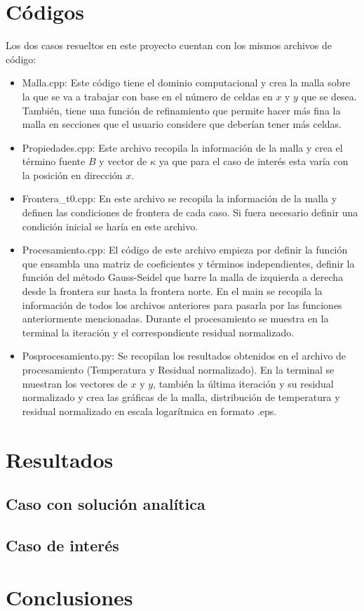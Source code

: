 \documentclass[article,latterpaper]{IEEEtran}
\begin{document}
\section{Códigos}
Los dos casos resueltos en este proyecto cuentan con los mismos archivos de código:

\begin{itemize}
	\item Malla.cpp: Este código tiene el dominio computacional y crea la malla sobre la que se va a trabajar con base en el número de celdas en $x$ y $y$ que se desea. También, tiene una función de refinamiento que permite hacer más fina la malla en secciones que el usuario considere que deberían tener más celdas.
	\item Propiedades.cpp: Este archivo recopila la información de la malla y crea el término fuente $B$ y vector de $\kappa$ ya que para el caso de interés esta varía con la posición en dirección $x$.
	\item Frontera\_t0.cpp: En este archivo se recopila la información de la malla y definen las condiciones de frontera de cada caso. Si fuera necesario definir una condición inicial se haría en este archivo.
	\item Procesamiento.cpp: El código de este archivo empieza por definir la función que ensambla una matriz de coeficientes y términos independientes, definir la función del método Gauss-Seidel que barre la malla de izquierda a derecha desde la frontera sur hasta la frontera norte. En el main se recopila la información de todos los archivos anteriores para pasarla por las funciones anteriormente mencionadas. Durante el procesamiento se muestra en la terminal la iteración y el correspondiente residual normalizado.
	\item Posprocesamiento.py: Se recopilan los resultados obtenidos en el archivo de procesamiento (Temperatura y Residual normalizado). En la terminal se muestran los vectores de $x$ y $y$, también la última iteración y su residual normalizado y crea las gráficas de la malla, distribución de temperatura y residual normalizado en escala logarítmica en formato .eps.
\end{itemize}

\section{Resultados}
\subsection{Caso con solución analítica}

\subsection{Caso de interés}

\section{Conclusiones}
\end{document}
